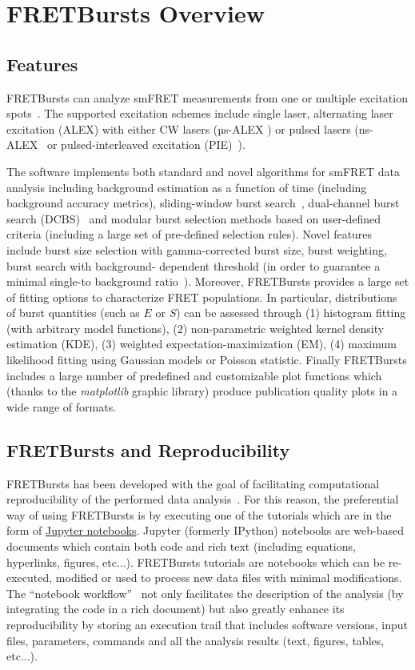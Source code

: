 \section{FRETBursts Overview}
\label{sec:overview}

\subsection{Features}


FRETBursts can analyze smFRET measurements
from one or multiple excitation spots~\cite{Ingargiola_2013}. The supported
excitation schemes include single laser, alternating laser excitation (ALEX)
with either CW lasers (µs-ALEX \cite{Kapanidis_2005})
or pulsed lasers (ns-ALEX~\cite{Laurence_2005} or
pulsed-interleaved excitation (PIE)~\cite{M_ller_2005}).

The software implements both standard and novel algorithms for smFRET data analysis
including background estimation as a function of time (including background accuracy
metrics), sliding-window burst search~\cite{Eggeling_1998}, 
dual-channel burst search (DCBS)~\cite{Nir_2006} and
modular burst selection methods based on user-defined criteria
(including a large set of pre-defined selection rules). Novel features include burst size
selection with gamma-corrected burst size, burst weighting, burst search with background-
dependent threshold (in order to guarantee a minimal single-to background 
ratio~\cite{Michalet_2012}).
Moreover, FRETBursts provides a large set of fitting options to characterize FRET populations. 
In particular, distributions of burst quantities (such as $E$ or $S$) can be assessed
through (1) histogram fitting (with arbitrary model functions),
(2) non-parametric weighted kernel density estimation (KDE), (3) weighted
expectation-maximization (EM), (4) maximum likelihood fitting using Gaussian models
or Poisson statistic. Finally FRETBursts includes a large number of
predefined and customizable plot functions which (thanks to the \textit{matplotlib}
graphic library) produce publication quality plots in a wide range of formats.


\subsection{FRETBursts and Reproducibility}
FRETBursts has been developed with the goal of facilitating computational reproducibility
of the performed data analysis~\cite{Buckheit_1995}. For this reason,
the preferential way of using FRETBursts is by executing one of the tutorials
which are in the form of \href{http://ipython.org/notebook.html}{Jupyter notebooks}.
Jupyter (formerly IPython) notebooks are web-based documents which contain both
code and rich text (including equations, hyperlinks, figures, etc...).
FRETBursts tutorials are notebooks which can be re-executed,
modified or used to process new data files with minimal modifications.
The ``notebook workflow''~\cite{Shen_2014} not only facilitates
the description of the analysis (by integrating the code in a rich document)
but also greatly enhance its reproducibility by storing an execution trail
that includes software versions, input files, parameters, commands and all
the analysis results (text, figures, tables, etc...).


